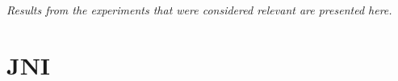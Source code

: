 \textit{Results from the experiments that were considered relevant are presented here.}

\section{JNI}


